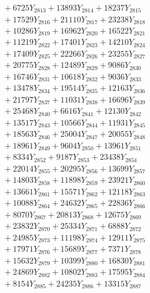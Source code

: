 \documentclass[a4paper,10pt]{article}
\begin{document}
{\begin{align}
&\;  + 6725 Y_{2813} + 13893 Y_{2814} + 18237 Y_{2815} \\[0.3ex]
&\;  + 17529 Y_{2816} + 21110 Y_{2817} + 23238 Y_{2818} \\[0.5ex]\allowbreak
&\;  + 10286 Y_{2819} + 16962 Y_{2820} + 16522 Y_{2821} \\[0.3ex]
&\;  + 11219 Y_{2822} + 17401 Y_{2823} + 14210 Y_{2824} \\[0.3ex]
&\;  + 17409 Y_{2825} + 22266 Y_{2826} + 23255 Y_{2827} \\[0.3ex]
&\;  + 20775 Y_{2828} + 12489 Y_{2829} + 9086 Y_{2830} \\[0.3ex]
&\;  + 16746 Y_{2831} + 10618 Y_{2832} + 9036 Y_{2833} \\[0.3ex]
&\;  + 13478 Y_{2834} + 19514 Y_{2835} + 12163 Y_{2836} \\[0.3ex]
&\;  + 21797 Y_{2837} + 11031 Y_{2838} + 16696 Y_{2839} \\[0.3ex]
&\;  + 25468 Y_{2840} + 6616 Y_{2841} + 12130 Y_{2842} \\[0.3ex]
&\;  + 13517 Y_{2843} + 10566 Y_{2844} + 11931 Y_{2845} \\[0.3ex]
&\;  + 18563 Y_{2846} + 25004 Y_{2847} + 20055 Y_{2848} \\[0.5ex]\allowbreak
&\;  + 18961 Y_{2849} + 9604 Y_{2850} + 13961 Y_{2851} \\[0.3ex]
&\;  + 8334 Y_{2852} + 9187 Y_{2853} + 23438 Y_{2854} \\[0.3ex]
&\;  + 22014 Y_{2855} + 20295 Y_{2856} + 13699 Y_{2857} \\[0.3ex]
&\;  + 14803 Y_{2858} + 11898 Y_{2859} + 23921 Y_{2860} \\[0.3ex]
&\;  + 13661 Y_{2861} + 15571 Y_{2862} + 12118 Y_{2863} \\[0.3ex]
&\;  + 10088 Y_{2864} + 24632 Y_{2865} + 22836 Y_{2866} \\[0.3ex]
&\;  + 8070 Y_{2867} + 20813 Y_{2868} + 12675 Y_{2869} \\[0.3ex]
&\;  + 23832 Y_{2870} + 25334 Y_{2871} + 6888 Y_{2872} \\[0.3ex]
&\;  + 24985 Y_{2873} + 11198 Y_{2874} + 12911 Y_{2875} \\[0.3ex]
&\;  + 17971 Y_{2876} + 15689 Y_{2877} + 7371 Y_{2878} \\[0.5ex]\allowbreak
&\;  + 15632 Y_{2879} + 10399 Y_{2880} + 16830 Y_{2881} \\[0.3ex]
&\;  + 24869 Y_{2882} + 10802 Y_{2883} + 17595 Y_{2884} \\[0.3ex]
&\;  + 8154 Y_{2885} + 24235 Y_{2886} + 13315 Y_{2887} \\[0.3ex]

\end{align}}
\end{document}
